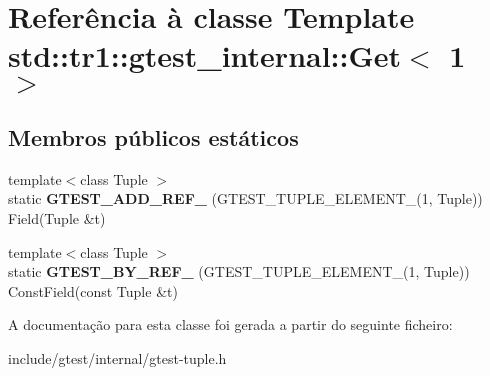 \hypertarget{classstd_1_1tr1_1_1gtest__internal_1_1Get_3_011_01_4}{\section{Referência à classe Template std\-:\-:tr1\-:\-:gtest\-\_\-internal\-:\-:Get$<$ 1 $>$}
\label{classstd_1_1tr1_1_1gtest__internal_1_1Get_3_011_01_4}
}
\subsection*{Membros públicos estáticos}
\begin{DoxyCompactItemize}
\item 
\hypertarget{classstd_1_1tr1_1_1gtest__internal_1_1Get_3_011_01_4_a52b2f5d2bc283d76a3e8dede84dba154}{{\footnotesize template$<$class Tuple $>$ }\\static {\bfseries G\-T\-E\-S\-T\-\_\-\-A\-D\-D\-\_\-\-R\-E\-F\-\_\-} (G\-T\-E\-S\-T\-\_\-\-T\-U\-P\-L\-E\-\_\-\-E\-L\-E\-M\-E\-N\-T\-\_\-(1, Tuple)) Field(Tuple \&t)}\label{classstd_1_1tr1_1_1gtest__internal_1_1Get_3_011_01_4_a52b2f5d2bc283d76a3e8dede84dba154}

\item 
\hypertarget{classstd_1_1tr1_1_1gtest__internal_1_1Get_3_011_01_4_a481a2bf839c758408d46a1d0d41ff8f4}{{\footnotesize template$<$class Tuple $>$ }\\static {\bfseries G\-T\-E\-S\-T\-\_\-\-B\-Y\-\_\-\-R\-E\-F\-\_\-} (G\-T\-E\-S\-T\-\_\-\-T\-U\-P\-L\-E\-\_\-\-E\-L\-E\-M\-E\-N\-T\-\_\-(1, Tuple)) Const\-Field(const Tuple \&t)}\label{classstd_1_1tr1_1_1gtest__internal_1_1Get_3_011_01_4_a481a2bf839c758408d46a1d0d41ff8f4}

\end{DoxyCompactItemize}


A documentação para esta classe foi gerada a partir do seguinte ficheiro\-:\begin{DoxyCompactItemize}
\item 
include/gtest/internal/gtest-\/tuple.\-h\end{DoxyCompactItemize}
